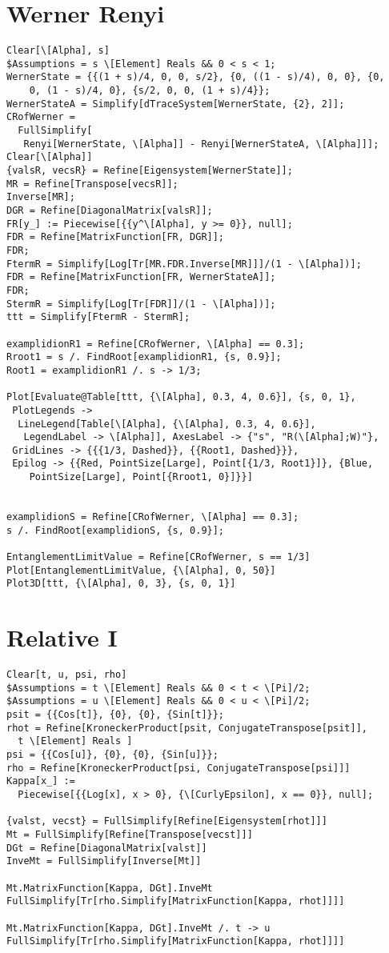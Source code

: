 \section{Werner Renyi}
\begin{verbatim}
Clear[\[Alpha], s]
$Assumptions = s \[Element] Reals && 0 < s < 1;
WernerState = {{(1 + s)/4, 0, 0, s/2}, {0, ((1 - s)/4), 0, 0}, {0, 
    0, (1 - s)/4, 0}, {s/2, 0, 0, (1 + s)/4}};
WernerStateA = Simplify[dTraceSystem[WernerState, {2}, 2]];
CRofWerner = 
  FullSimplify[
   Renyi[WernerState, \[Alpha]] - Renyi[WernerStateA, \[Alpha]]];
Clear[\[Alpha]]
{valsR, vecsR} = Refine[Eigensystem[WernerState]];
MR = Refine[Transpose[vecsR]];
Inverse[MR];
DGR = Refine[DiagonalMatrix[valsR]];
FR[y_] := Piecewise[{{y^\[Alpha], y >= 0}}, null];
FDR = Refine[MatrixFunction[FR, DGR]];
FDR;
FtermR = Simplify[Log[Tr[MR.FDR.Inverse[MR]]]/(1 - \[Alpha])];
FDR = Refine[MatrixFunction[FR, WernerStateA]];
FDR;
StermR = Simplify[Log[Tr[FDR]]/(1 - \[Alpha])];
ttt = Simplify[FtermR - StermR];

examplidionR1 = Refine[CRofWerner, \[Alpha] == 0.3];
Rroot1 = s /. FindRoot[examplidionR1, {s, 0.9}];
Root1 = examplidionR1 /. s -> 1/3;

Plot[Evaluate@Table[ttt, {\[Alpha], 0.3, 4, 0.6}], {s, 0, 1}, 
 PlotLegends -> 
  LineLegend[Table[\[Alpha], {\[Alpha], 0.3, 4, 0.6}], 
   LegendLabel -> \[Alpha]], AxesLabel -> {"s", "R(\[Alpha];W)"}, 
 GridLines -> {{{1/3, Dashed}}, {{Root1, Dashed}}}, 
 Epilog -> {{Red, PointSize[Large], Point[{1/3, Root1}]}, {Blue, 
    PointSize[Large], Point[{Rroot1, 0}]}}]


examplidionS = Refine[CRofWerner, \[Alpha] == 0.3];
s /. FindRoot[examplidionS, {s, 0.9}];

EntanglementLimitValue = Refine[CRofWerner, s == 1/3]
Plot[EntanglementLimitValue, {\[Alpha], 0, 50}]
Plot3D[ttt, {\[Alpha], 0, 3}, {s, 0, 1}]
\end{verbatim}
\section{Relative I}
\begin{verbatim}
Clear[t, u, psi, rho]
$Assumptions = t \[Element] Reals && 0 < t < \[Pi]/2;
$Assumptions = u \[Element] Reals && 0 < u < \[Pi]/2;
psit = {{Cos[t]}, {0}, {0}, {Sin[t]}};
rhot = Refine[KroneckerProduct[psit, ConjugateTranspose[psit]], 
  t \[Element] Reals ]
psi = {{Cos[u]}, {0}, {0}, {Sin[u]}};
rho = Refine[KroneckerProduct[psi, ConjugateTranspose[psi]]]
Kappa[x_] := 
  Piecewise[{{Log[x], x > 0}, {\[CurlyEpsilon], x == 0}}, null];

{valst, vecst} = FullSimplify[Refine[Eigensystem[rhot]]]
Mt = FullSimplify[Refine[Transpose[vecst]]]
DGt = Refine[DiagonalMatrix[valst]]
InveMt = FullSimplify[Inverse[Mt]]

Mt.MatrixFunction[Kappa, DGt].InveMt
FullSimplify[Tr[rho.Simplify[MatrixFunction[Kappa, rhot]]]]

Mt.MatrixFunction[Kappa, DGt].InveMt /. t -> u
FullSimplify[Tr[rho.Simplify[MatrixFunction[Kappa, rhot]]]]
\end{verbatim}
